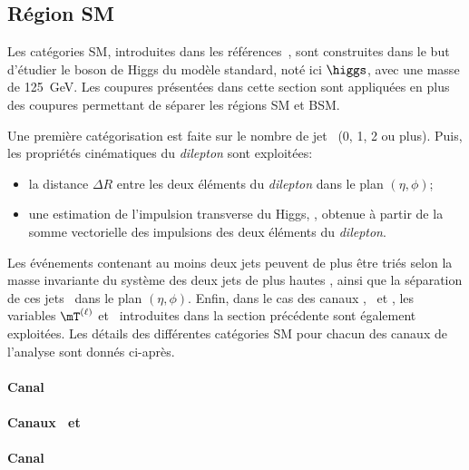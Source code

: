 \subsection{Région \og SM \fg{}}\label{chapter-HTT_analysis-section-categorisation-SM}
Les catégories SM, introduites dans les références~\cite{Artur_thesis,sm_categories}, sont construites dans le but d'étudier le boson de Higgs du modèle standard, noté ici $\higgs$, avec une masse de \SI{125}{\GeV}.
Les coupures présentées dans cette section sont appliquées en plus des coupures permettant de séparer les régions SM et BSM.
\par
Une première catégorisation est faite sur le nombre de jet \Njets\ (0, 1, 2 ou plus).
Puis, les propriétés cinématiques du \emph{dilepton} sont exploitées:
\begin{itemize}
\item la distance $\Delta R$ entre les deux éléments du \emph{dilepton} dans le plan $(\eta,\phi)$;
\item une estimation de l'impulsion transverse du Higgs, \pTHiggs, obtenue à partir de la somme vectorielle des impulsions des deux éléments du \emph{dilepton}.
\end{itemize}
Les événements contenant au moins deux jets peuvent de plus être triés selon \mjj la masse invariante du système des deux jets de plus hautes \pT, ainsi que la séparation de ces jets \Detajj\ dans le plan $(\eta,\phi)$.
Enfin, dans le cas des canaux \mu\tauh, \ele\tauh\ et \ele\mu, les variables $\mT^{(\ell)}$ et \Dzeta\ introduites dans la section précédente sont également exploitées.
Les détails des différentes catégories SM pour chacun des canaux de l'analyse sont donnés ci-après.
\paragraph{Canal \tauh\tauh}

\paragraph{Canaux \mu\tauh\ et \ele\tauh}

\paragraph{Canal \ele\mu}


	
